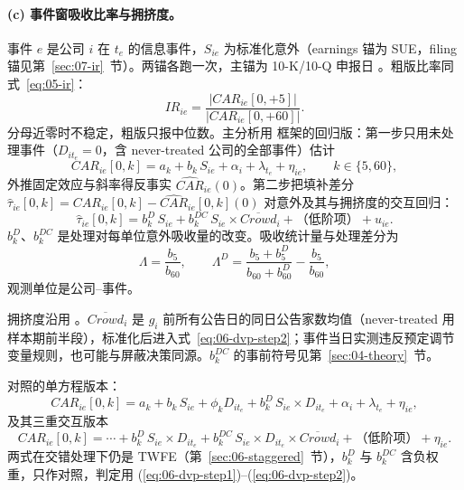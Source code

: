 \documentclass[a4paper,11pt]{ctexart}
\begin{document}
\paragraph{(c) 事件窗吸收比率与拥挤度。}
事件 $e$ 是公司 $i$ 在 $t_e$ 的信息事件，$S_{ie}$ 为标准化意外（earnings 锚为 SUE，filing 锚见第~\ref{sec:07-ir}~节）。两锚各跑一次，主锚为 10-K/10-Q 申报日 \citep{liramesh2009}。粗版比率同式~\eqref{eq:05-ir}：
\begin{equation}\label{eq:06-IR}
IR_{ie}=\frac{\big|CAR_{ie}[0,+5]\big|}{\big|CAR_{ie}[0,+60]\big|} .
\end{equation}
分母近零时不稳定，粗版只报中位数。主分析用 \citet{dellavignapollet2009} 框架的回归版：第一步只用未处理事件（$D_{it_e}=0$，含 never-treated 公司的全部事件）估计
\begin{equation}\label{eq:06-dvp-step1}
CAR_{ie}[0,k]=a_k+b_k\,S_{ie}+\alpha_i+\lambda_{t_e}+\eta_{ie},\qquad k\in\{5,60\},
\end{equation}
外推固定效应与斜率得反事实 $\widehat{CAR}_{ie}(0)$。第二步把填补差分 $\hat\tau_{ie}[0,k]=CAR_{ie}[0,k]-\widehat{CAR}_{ie}[0,k](0)$ 对意外及其与拥挤度的交互回归：
\begin{equation}\label{eq:06-dvp-step2}
\hat\tau_{ie}[0,k]=b^{D}_{k}\,S_{ie}+b^{DC}_{k}\,S_{ie}\times\overline{Crowd}_i+\text{（低阶项）}+u_{ie} .
\end{equation}
$b^{D}_{k}$、$b^{DC}_{k}$ 是处理对每单位意外吸收量的改变。吸收统计量与处理差分为
\begin{equation}\label{eq:06-absorption}
\Lambda=\frac{b_5}{b_{60}},\qquad
\Lambda^{D}=\frac{b_5+b_5^{D}}{b_{60}+b_{60}^{D}}-\frac{b_5}{b_{60}},
\end{equation}
观测单位是公司--事件。

拥挤度沿用 \citet{hirshleiferlimteoh2009}。$\overline{Crowd}_i$ 是 $g_i$ 前所有公告日的同日公告家数均值（never-treated 用样本期前半段），标准化后进入式~\eqref{eq:06-dvp-step2}；事件当日实测违反预定调节变量规则，也可能与屏蔽决策同源。$b_k^{DC}$ 的事前符号见第~\ref{sec:04-theory}~节。

对照的单方程版本：
\begin{equation}\label{eq:06-dvp-reg}
CAR_{ie}[0,k]=a_k+b_k\,S_{ie}+\phi_k D_{it_e}+b_k^{D}\,S_{ie}\times D_{it_e}+\alpha_i+\lambda_{t_e}+\eta_{ie},
\end{equation}
及其三重交互版本
\begin{equation}\label{eq:06-hlt}
CAR_{ie}[0,k]=\cdots+b_k^{D}\,S_{ie}\times D_{it_e}+b_k^{DC}\,S_{ie}\times D_{it_e}\times\overline{Crowd}_i+\text{（低阶项）}+\eta_{ie}.
\end{equation}
两式在交错处理下仍是 TWFE（第~\ref{sec:06-staggered}~节），$b^D_k$ 与 $b^{DC}_k$ 含负权重，只作对照，判定用 (\ref{eq:06-dvp-step1})--(\ref{eq:06-dvp-step2})。
\end{document}
